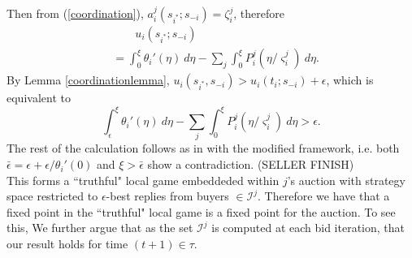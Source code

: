 \documentclass[12pt]{article}
\theoremstyle{definition}
\newcommand{\vs}{\varsigma}
\newcommand{\mcI}{\mathcal{I}}
\begin{document}
\begin{multicols}{2}
Then from
(\ref{coordination}), $a_i^j(s_{i^*}; s_{-i}) = \zeta_i^j$, therefore
\begin{align*}
    &\qquad u_i(s_{i^*};s_{-i}) \\
    &= \displaystyle\int_0^\xi {\theta_i}'(\eta)\ d\eta -\sum_j\int_0^\xi P_i^j(\eta/\vs_i^j) \ d\eta.
\end{align*}
By Lemma \ref{coordinationlemma}, $u_i(s_{i^*}, s_{-i}) > u_i(t_i; s_{-i}) +
\epsilon$, which is equivalent to 
$$
    \int_\epsilon^\xi {\theta_i}'(\eta) \ d\eta - \sum_j\int_0^\xi
P_i^j(\eta/\vs_i^j) \ d\eta > \epsilon.
$$
The rest of the calculation follows as in \cite{semret} with the modified
framework, i.e. both $\bar\epsilon = \epsilon + \epsilon/{\theta_i}'(0)$ and
$\xi > \bar\epsilon$ show a contradiction.
(SELLER FINISH)\\
This forms a ``truthful" local game embeddeded within $j$'s auction with strategy space
restricted to $\epsilon$-best replies from buyers $\in \mcI^j$. Therefore we have that a
fixed point in the ``truthful" local game is a fixed point for the auction.
To see this, We
further argue that as the set $\mcI^j$ is
computed at each bid iteration, that our result holds for time $(t+1) \in \tau$.


{
}


\end{multicols}
\end{document}
